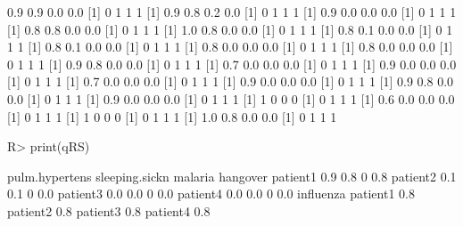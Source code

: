 \begin{Schunk}
% --begin: "comp.quant.atleast"
\begin{Soutput}
[1] 0.9 0.9 0.0 0.0
[1] 0 1 1 1
[1] 0.9 0.8 0.2 0.0
[1] 0 1 1 1
[1] 0.9 0.0 0.0 0.0
[1] 0 1 1 1
[1] 0.8 0.8 0.0 0.0
[1] 0 1 1 1
[1] 1.0 0.8 0.0 0.0
[1] 0 1 1 1
[1] 0.8 0.1 0.0 0.0
[1] 0 1 1 1
[1] 0.8 0.1 0.0 0.0
[1] 0 1 1 1
[1] 0.8 0.0 0.0 0.0
[1] 0 1 1 1
[1] 0.8 0.0 0.0 0.0
[1] 0 1 1 1
[1] 0.9 0.8 0.0 0.0
[1] 0 1 1 1
[1] 0.7 0.0 0.0 0.0
[1] 0 1 1 1
[1] 0.9 0.0 0.0 0.0
[1] 0 1 1 1
[1] 0.7 0.0 0.0 0.0
[1] 0 1 1 1
[1] 0.9 0.0 0.0 0.0
[1] 0 1 1 1
[1] 0.9 0.8 0.0 0.0
[1] 0 1 1 1
[1] 0.9 0.0 0.0 0.0
[1] 0 1 1 1
[1] 1 0 0 0
[1] 0 1 1 1
[1] 0.6 0.0 0.0 0.0
[1] 0 1 1 1
[1] 1 0 0 0
[1] 0 1 1 1
[1] 1.0 0.8 0.0 0.0
[1] 0 1 1 1
\end{Soutput}
\begin{Sinput}
R> print(qRS)
\end{Sinput}
\begin{Soutput}
         pulm.hypertens sleeping.sickn malaria hangover
patient1            0.9            0.8       0      0.8
patient2            0.1            0.1       0      0.0
patient3            0.0            0.0       0      0.0
patient4            0.0            0.0       0      0.0
         influenza
patient1       0.8
patient2       0.8
patient3       0.8
patient4       0.8
\end{Soutput}
%
% --end: "comp.quant.atleast"
\end{Schunk}
